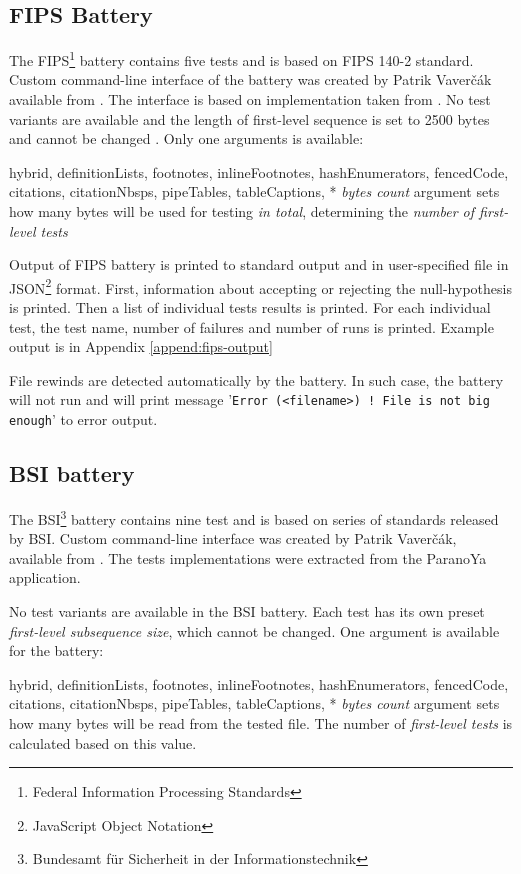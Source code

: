 \documentclass[
  digital,     %
  oneside,     %
  nosansbold,  %
  nocolorbold, %
  nolof,         %
  nolot,         %
]{fithesis4}
\begin{document}
\subsection{FIPS Battery} \label{chap:sols-fips}
The FIPS\footnote{Federal Information Processing Standards} battery contains five tests and is based on FIPS 140-2 standard. \cite{fips_stand} Custom command-line interface of the battery was created by Patrik Vaverčák available from \cite{rtt-py-batteries}. The interface is based on implementation taken from \cite{fips-site}. No test variants are available and the length of first-level sequence is set to 2500 bytes and cannot be changed \cite[p. 20]{vavercak}. Only one arguments is available:
\begin{markdown*}{%
  hybrid,
  definitionLists,
  footnotes,
  inlineFootnotes,
  hashEnumerators,
  fencedCode,
  citations,
  citationNbsps,
  pipeTables,
  tableCaptions,
}
* \emph{bytes count} argument sets how many bytes will be used for testing \emph{in total}, determining the \emph{number of first-level tests} %
\end{markdown*}

Output of FIPS battery is printed to standard output and in user-specified file in JSON\footnote{JavaScript Object Notation} format. First, information about accepting or rejecting the null-hypothesis is printed. Then a list of individual tests results is printed. For each individual test, the test name, number of failures and number of runs is printed. Example output is in Appendix \ref{append:fips-output}

File rewinds are detected automatically by the battery. In such case, the battery will not run and will print message '\texttt{Error (<filename>) ! File is not big enough}' to error output.

\subsection{BSI battery} \label{chap:sols-bsi}
The BSI\footnote{Bundesamt für Sicherheit in der Informationstechnik} battery contains nine test and is based on series of standards released by BSI. \cite{bsi_stand} Custom command-line interface was created by Patrik Vaverčák, available from \cite{rtt-py-batteries}. The tests implementations were extracted from the ParanoYa application. \cite[p. 16]{vavercak}

No test variants are available in the BSI battery. Each test has its own preset \emph{first-level subsequence size}, which cannot be changed. One argument is available for the battery:
\begin{markdown*}{%
  hybrid,
  definitionLists,
  footnotes,
  inlineFootnotes,
  hashEnumerators,
  fencedCode,
  citations,
  citationNbsps,
  pipeTables,
  tableCaptions,
}
* \emph{bytes count} argument sets how many bytes will be read from the tested file. The number of \emph{first-level tests} is calculated based on this value.
\end{markdown*}
\end{document}
